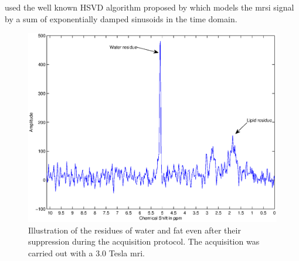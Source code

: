 \begin{enumerate}[leftmargin=*]
	\cite{Kelm2007} used the well known HSVD algorithm proposed by \cite{Pijnappel1992} which models the \ac{mrsi} signal by a sum of exponentially damped sinusoids in the time domain.%
%
%

\begin{figure}
\centering
	\includegraphics[width=0.9\linewidth]{03_image_processing/03_preprocessing/figures/water/water_fat.eps}
	\caption{Illustration of the residues of water and fat even after their suppression during the acquisition protocol. The acquisition was carried out with a 3.0 Tesla \ac{mri}.}
	\label{fig:waterfat}
\end{figure}
	

\end{enumerate}
